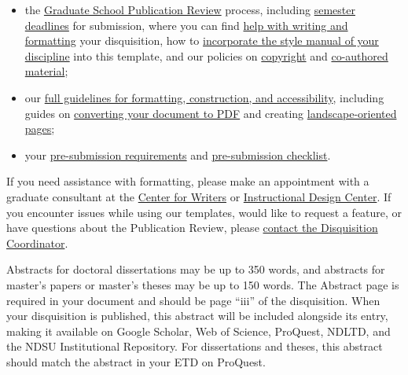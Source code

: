 \begin{itemize}
    \item the \href{https://www.ndsu.edu/cfwriters/disquisitions/graduate-school-publication-review-policies}{Graduate School Publication Review} process, including \href{https://www.ndsu.edu/cfwriters/disquisitions/graduate-school-publication-review-policies\#section-1099663}{semester deadlines} for submission, where you can find \href{https://www.ndsu.edu/cfwriters/disquisitions/graduate-school-publication-review-policies\#section-1064488}{help with writing and formatting} your disquisition, how to \href{https://www.ndsu.edu/cfwriters/disquisitions/graduate-school-publication-review-policies\#section-1064489}{incorporate the style manual of your discipline} into this template, and our policies on \href{https://www.ndsu.edu/cfwriters/disquisitions/graduate-school-publication-review-policies\#section-1064491}{copyright} and \href{https://www.ndsu.edu/cfwriters/disquisitions/graduate-school-publication-review-policies\#section-1064492}{co-authored material};
    \item our \href{https://www.ndsu.edu/cfwriters/disquisitions/dqkb}{full guidelines for formatting, construction, and accessibility}, including guides on \href{https://www.ndsu.edu/cfwriters/disquisitions/dqkb/converting-to-pdf}{converting your document to PDF} and creating \href{https://www.ndsu.edu/cfwriters/disquisitions/dqkb/landscape-pages}{landscape-oriented pages};
    \item your \href{https://www.ndsu.edu/cfwriters/disquisitions/pre-submission-requirements}{pre-submission requirements} and \href{https://www.ndsu.edu/cfwriters/disquisitions/submission-checklist}{pre-submission checklist}.
\end{itemize}

If you need assistance with formatting, please make an appointment with a graduate consultant at the \href{https://ndsu.mywconline.com/}{Center for Writers} or \href{https://itservice.ndsu.edu/support/catalog/items/217}{Instructional Design Center}. If you encounter issues while using our templates, would like to request a feature, or have questions about the Publication Review, please \href{mailto:ndsu.disq.coordinator@ndsu.edu}{contact the Disquisition Coordinator}.

Abstracts for doctoral dissertations may be up to 350 words, and abstracts for master's papers or master's theses may be up to 150 words. The Abstract page is required in your document and should be page ``iii'' of the disquisition. When your disquisition is published, this abstract will be included alongside its entry, making it available on Google Scholar, Web of Science, ProQuest, NDLTD, and the NDSU Institutional Repository. For dissertations and theses, this abstract should match the abstract in your ETD on ProQuest.

\clearpage
